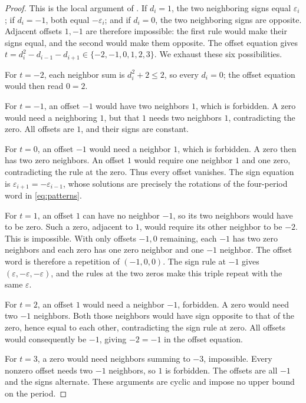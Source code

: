 \begin{proof}
This is the local argument of \cite[Section 4]{c412}.
If $d_i=1$, the two neighboring signs equal $\varepsilon_i$;
if $d_i=-1$, both equal $-\varepsilon_i$; and if $d_i=0$,
the two neighboring signs are opposite. Adjacent offsets $1,-1$
are therefore impossible: the first rule would make their signs
equal, and the second would make them opposite.
The offset equation gives
$t=d_i^2-d_{i-1}-d_{i+1}\in\{-2,-1,0,1,2,3\}$.
We exhaust these six possibilities.

For $t=-2$, each neighbor sum is $d_i^2+2\le2$, so every
$d_i=0$; the offset equation would then read $0=2$.

For $t=-1$, an offset $-1$ would have two neighbors $1$,
which is forbidden. A zero would need a neighboring $1$, but
that $1$ needs two neighbors $1$, contradicting the zero.
All offsets are $1$, and their signs are constant.

For $t=0$, an offset $-1$ would need a neighbor $1$, which is
forbidden. A zero then has two zero neighbors. An offset $1$
would require one neighbor $1$ and one zero, contradicting the
rule at the zero. Thus every offset vanishes.
The sign equation is $\varepsilon_{i+1}=-\varepsilon_{i-1}$,
whose solutions are precisely the rotations of the four-period
word in \eqref{eq:patterns}.

For $t=1$, an offset $1$ can have no neighbor $-1$, so its
two neighbors would have to be zero. Such a zero, adjacent to
$1$, would require its other neighbor to be $-2$.
This is impossible. With only offsets $-1,0$ remaining, each
$-1$ has two zero neighbors and each zero has one zero neighbor
and one $-1$ neighbor. The offset word is therefore a repetition
of $(-1,0,0)$. The sign rule at $-1$ gives
$(\varepsilon,-\varepsilon,-\varepsilon)$, and the rules at
the two zeros make this triple repeat with the same $\varepsilon$.

For $t=2$, an offset $1$ would need a neighbor $-1$, forbidden.
A zero would need two $-1$ neighbors. Both those neighbors
would have sign opposite to that of the zero, hence equal to
each other, contradicting the sign rule at zero. All offsets
would consequently be $-1$, giving $-2=-1$ in the offset equation.

For $t=3$, a zero would need neighbors summing to $-3$,
impossible. Every nonzero offset needs two $-1$ neighbors, so
$1$ is forbidden. The offsets are all $-1$ and the signs alternate.
These arguments are cyclic and impose no upper bound on the period.
\end{proof}


